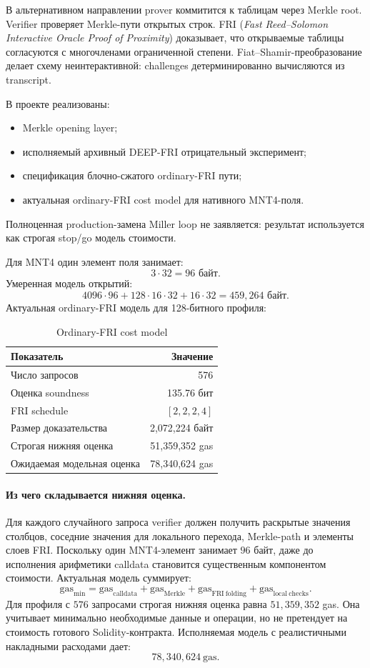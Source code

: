 \documentclass[12pt,a4paper]{article}
\newcommand{\Gas}{\mathrm{gas}}
\begin{document}
В альтернативном направлении prover коммитится к таблицам через Merkle root.
Verifier проверяет Merkle-пути открытых строк. FRI
(\emph{Fast Reed--Solomon Interactive Oracle Proof of Proximity}) доказывает,
что открываемые таблицы согласуются с многочленами ограниченной степени.
Fiat--Shamir-преобразование делает схему неинтерактивной: challenges
детерминированно вычисляются из transcript.

В проекте реализованы:
\begin{itemize}
    \item Merkle opening layer;
    \item исполняемый архивный DEEP-FRI отрицательный эксперимент;
    \item спецификация блочно-сжатого ordinary-FRI пути;
    \item актуальная ordinary-FRI cost model для нативного MNT4-поля.
\end{itemize}
Полноценная production-замена Miller loop не заявляется: результат используется
как строгая stop/go модель стоимости.

Для MNT4 один элемент поля занимает:
\[
    3\cdot 32=96\text{ байт}.
\]
Умеренная модель открытий:
\[
    4096\cdot96+128\cdot16\cdot32+16\cdot32
    =459{,}264\text{ байт}.
\]
Актуальная ordinary-FRI модель для 128-битного профиля:

\begin{table}[htbp]
\centering
\caption{Ordinary-FRI cost model}
\small
\begin{tabular}{l r}
\toprule
Показатель & Значение \\
\midrule
Число запросов & 576 \\
Оценка soundness & 135.76 бит \\
FRI schedule & $[2,2,2,4]$ \\
Размер доказательства & 2,072,224 байт \\
Строгая нижняя оценка & 51,359,352 gas \\
Ожидаемая модельная оценка & 78,340,624 gas \\
\bottomrule
\end{tabular}
\end{table}

\paragraph{Из чего складывается нижняя оценка.}
Для каждого случайного запроса verifier должен получить раскрытые значения
столбцов, соседние значения для локального перехода, Merkle-path и элементы
слоев FRI. Поскольку один MNT4-элемент занимает $96$ байт, даже до исполнения
арифметики calldata становится существенным компонентом стоимости. Актуальная
модель суммирует:
\[
    \Gas_{\min}
    =
    \Gas_{\mathrm{calldata}}
    +
    \Gas_{\mathrm{Merkle}}
    +
    \Gas_{\mathrm{FRI\ folding}}
    +
    \Gas_{\mathrm{local\ checks}}.
\]
Для профиля с $576$ запросами строгая нижняя оценка равна
$51{,}359{,}352$ gas. Она учитывает минимально необходимые данные и операции,
но не претендует на стоимость готового Solidity-контракта. Исполняемая модель
с реалистичными накладными расходами дает:
\[
    78{,}340{,}624\ \Gas.
\]
\end{document}
